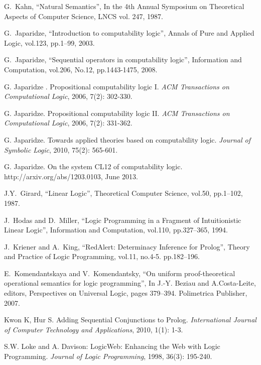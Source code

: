 \documentclass[letter]{ieice}
\begin{document}
\begin{thebibliography}{999}
G.~Kahn,  ``Natural Semantics'', In the 4th Annual Symposium on Theoretical Aspects of Computer Science, 
LNCS vol. 247,  1987.


G.~Japaridze, ``Introduction to computability logic'', Annals  of Pure and
 Applied  Logic, vol.123, pp.1--99, 2003.

G.~Japaridze,   ``Sequential operators in computability logic'',
 Information and Computation, vol.206, No.12, pp.1443-1475, 2008.  


 G. Japaridze . Propositional computability logic I. {\it ACM Transactions on Computational Logic}, 2006, 7(2): 302-330.
  
 G. Japaridze. Propositional computability logic II. {\it ACM Transactions on Computational Logic}, 2006, 7(2): 331-362.

 G. Japaridze. Towards applied theories based on computability logic. {\it Journal of Symbolic Logic}, 2010, 75(2): 565-601.



 G. Japaridze. On the system CL12 of computability logic. http://arxiv.org/abs/1203.0103, June 2013.






J.Y.~Girard, ``Linear Logic'', Theoretical Computer Science, vol.50, pp.1--102, 
1987.

J.~Hodas and D.~Miller, ``Logic Programming in a Fragment of Intuitionistic Linear Logic'', Information and Computation, vol.110, pp.327--365, 1994.

J.~Kriener and A.~King, ``RedAlert: Determinacy Inference for Prolog'', Theory and Practice of Logic Programming, vol.11, no.4-5. pp.182--196.


E.~Komendantskaya and V.~Komendantsky, ``On uniform proof-theoretical operational semantics for logic programming'',  In J.-Y. Beziau and A.Costa-Leite, editors, Perspectives on Universal Logic, pages 379--394. Polimetrica Publisher, 2007.



 Kwon K, Hur S. Adding Sequential Conjunctions to Prolog. {\it International Journal of Computer Technology and Applications}, 2010, 1(1): 1-3.



 
S.W. Loke and A. Davison:
LogicWeb: Enhancing the Web with Logic Programming. {\it Journal of Logic Programming},
1998, 36(3): 195-240.


\end{thebibliography}
\end{document}
